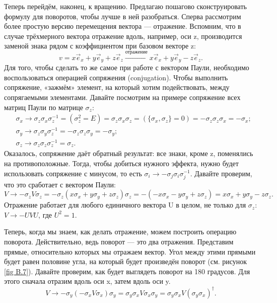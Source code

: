 Теперь перейдём, наконец, к вращению. Предлагаю пошагово сконструировать
формулу для поворотов, чтобы лучше в ней разобраться. Сперва рассмотрим более
простую версию перемещения вектора --- отражение. Вспомним, что в случае
трёхмерного вектора отражение вдоль, например, оси z, производится заменой
знака рядом с коэффициентом при базовом векторе z:
\[
  v = x\Vec{e}_x + y\Vec{e}_y + z\Vec{e}_z\xrightarrow{\text{отражение}} x\Vec{e}_x + y\Vec{e}_y - z\Vec{e}_z.
\]
Для того, чтобы сделать то же самое при работе с вектором Паули, необходимо
воспользоваться операцией сопряжения (conjugation). Чтобы выполнить сопряжение,
«зажмём» элемент, на который хотим подействовать, между сопрягаемыми
элементами. Давайте посмотрим на примере сопряжение всех матриц Паули по
матрице $\sigma_z$:
\begin{align*}
  &\sigma_x\rightarrow \sigma_z\sigma_x\sigma^{-1}_z = \left(\sigma_z^2 = E\right) = \sigma_z\sigma_x\sigma_z = \left(\{\sigma_x, \sigma_z\} = 0\right) = -\sigma_z\sigma_z\sigma_x = -\sigma_x;\\
  &\sigma_y\rightarrow \sigma_z\sigma_y\sigma_z^{-1} = -\sigma_z\sigma_z\sigma_y = -\sigma_y;\\
  &\sigma_z\rightarrow \sigma_z\sigma_z\sigma_z^{-1} = \sigma_z.
\end{align*}
Оказалось, сопряжение даёт обратный результат: все знаки, кроме z, поменялись
на противоположные. Тогда, чтобы добиться нужного эффекта, нужно будет
использовать сопряжение с минусом, то есть $\sigma_i \rightarrow
  -\sigma_j\sigma_i\sigma_j^{-1}$. Давайте проверим, что это сработает с вектором
Паули:
\[
  V \rightarrow -\sigma_z V\sigma_z = -\sigma_z \left(x\sigma_x + y\sigma_y + z\sigma_z\right)\sigma_z = -(-x\sigma_x - y\sigma_y + z\sigma_z) = x\sigma_x + y\sigma_y - z\sigma_z.
\]
Отражение работает для любого единичного вектора U в целом, не только для
$\sigma_z$: $V \rightarrow -UVU$, где $U^2 = 1$.

Теперь, когда мы знаем, как делать отражение, можем построить операцию
поворота. Действительно, ведь поворот --- это два отражения. Представим прямые,
относительно которых мы отражаем вектор. Угол между этими прямыми будет равен
половине угла, на который будет произведён поворот (см. рисунок \ref{fig B.7}).
Давайте проверим, как будет выглядеть поворот на 180 градусов. Для этого
сначала отразим вдоль оси x, затем вдоль оси y.
\[
  V \rightarrow -\sigma_y\left(-\sigma_xV\sigma_x\right)\sigma_y = \sigma_y\sigma_xV\sigma_x\sigma_y = \sigma_y\sigma_xV(\sigma_y\sigma_x)^{\dagger}.
\]

